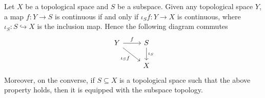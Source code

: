 \begin{theorem}
  Let \(X\) be a topological space and \(S\) be a subspace. Given any
  topological space \(Y\), a map \(f: Y \to S\) is continuous if and only if
  \(\iota_S  f : Y \to X\) is continuous, where \(\iota_S: S
  \hookrightarrow X\) is the inclusion map. Hence the following diagram commutes
  \[
    \begin{tikzcd}
      Y \ar[r, "f"] \ar[rd, swap, "\iota_S  f"]
        &S \ar[d, "\iota_S"] \\
        &X
    \end{tikzcd}
  \]
  Moreover, on the converse, if \(S \subseteq X\) is a topological space such
  that the above property holds, then it is equipped with the subspace topology.
\end{theorem}

